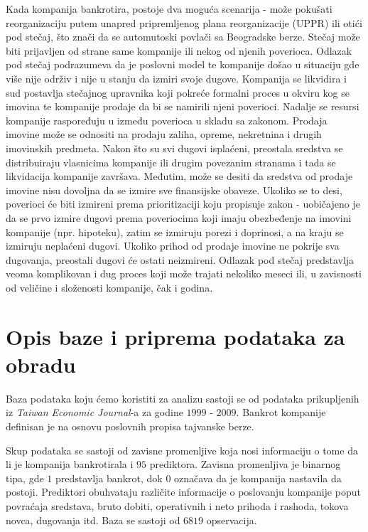 \documentclass[12pt]{article}
\theoremstyle{definition}
\theoremstyle{remark}
\begin{document}
Kada kompanija bankrotira, postoje dva moguća scenarija - može pokušati reorganizaciju putem unapred pripremljenog plana reorganizacije (UPPR) ili otići pod stečaj, što znači da se automutoski povlači sa Beogradske berze. Stečaj može biti prijavljen od strane same kompanije ili nekog od njenih poverioca. Odlazak pod stečaj podrazumeva da je poslovni model te kompanije došao u situaciju gde više nije održiv i nije u stanju da izmiri svoje dugove. Kompanija se likvidira i sud postavlja stečajnog upravnika koji pokreće formalni proces u okviru kog se imovina te kompanije prodaje da bi se namirili njeni poverioci. Nadalje se resursi kompanije raspoređuju u između poverioca u skladu sa zakonom. Prodaja imovine može se odnositi na prodaju zaliha, opreme, nekretnina i drugih imovinskih predmeta. Nakon što su svi dugovi isplaćeni, preostala sredstva se distribuiraju vlasnicima kompanije ili drugim povezanim stranama i tada se likvidacija kompanije završava. Međutim, može se desiti da sredstva od prodaje imovine nisu dovoljna da se izmire sve finansijske obaveze. Ukoliko se to desi, poverioci će biti izmireni prema prioritizaciji koju propisuje zakon - uobičajeno je da se prvo izmire dugovi prema poveriocima koji imaju obezbeđenje na imovini kompanije (npr. hipoteku), zatim se izmiruju porezi i doprinosi, a na kraju se izmiruju neplaćeni dugovi. Ukoliko prihod od prodaje imovine ne pokrije sva dugovanja, preostali dugovi će ostati neizmireni. Odlazak pod stečaj predstavlja veoma  komplikovan i dug proces koji može trajati nekoliko meseci ili, u zavisnosti od veličine i složenosti kompanije, čak i godina.

\newpage 

\section{Opis baze i priprema podataka za obradu}
\vspace{0.5 cm}

Baza podataka koju ćemo koristiti za analizu sastoji se od podataka prikupljenih iz  \emph{Taiwan Economic Journal}-a za godine $1999$ - $2009$. Bankrot kompanije definisan je na osnovu poslovnih propisa tajvanske berze. 

Skup podataka se sastoji od zavisne promenljive koja nosi informaciju o tome da li je kompanija bankrotirala i $95$ prediktora. Zavisna promenljiva je binarnog tipa, gde $1$ predstavlja bankrot, dok $0$ označava da je kompanija nastavila da postoji. Prediktori obuhvataju različite informacije o poslovanju kompanije poput povraćaja sredstava, bruto dobiti, operativnih i neto prihoda i rashoda, tokova novca, dugovanja itd. Baza se sastoji od $6819$ opservacija.
\end{document}
